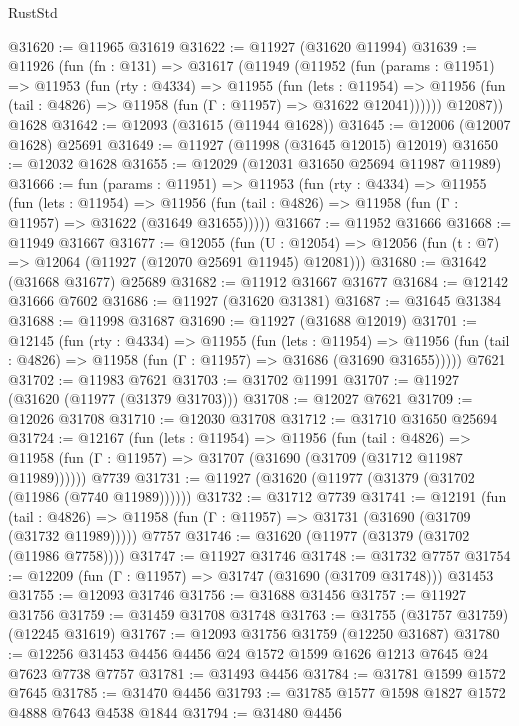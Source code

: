 \begin{lexlean}{RustStd}
\begin{coremodule}
@31620 := @11965 @31619
@31622 := @11927 (@31620 @11994)
@31639 := @11926
    (fun (fn : @131) =>
    @31617
      (@11949
        (@11952
          (fun (params : @11951) =>
          @11953
            (fun (rty : @4334) =>
            @11955
              (fun (lets : @11954) =>
              @11956 (fun (tail : @4826) => @11958 (fun (Γ : @11957) => @31622 @12041))))))
        @12087))
    @1628
@31642 := @12093 (@31615 (@11944 @1628))
@31645 := @12006 (@12007 @1628) @25691
@31649 := @11927 (@11998 (@31645 @12015) @12019)
@31650 := @12032 @1628
@31655 := @12029 (@12031 @31650 @25694 @11987 @11989)
@31666 := fun (params : @11951) =>
  @11953
    (fun (rty : @4334) =>
    @11955
      (fun (lets : @11954) =>
      @11956 (fun (tail : @4826) => @11958 (fun (Γ : @11957) => @31622 (@31649 @31655)))))
@31667 := @11952 @31666
@31668 := @11949 @31667
@31677 := @12055
    (fun (U : @12054) => @12056 (fun (t : @7) => @12064 (@11927 (@12070 @25691 @11945) @12081)))
@31680 := @31642 (@31668 @31677) @25689
@31682 := @11912 @31667 @31677
@31684 := @12142 @31666 @7602
@31686 := @11927 (@31620 @31381)
@31687 := @31645 @31384
@31688 := @11998 @31687
@31690 := @11927 (@31688 @12019)
@31701 := @12145
    (fun (rty : @4334) =>
    @11955
      (fun (lets : @11954) =>
      @11956 (fun (tail : @4826) => @11958 (fun (Γ : @11957) => @31686 (@31690 @31655)))))
    @7621
@31702 := @11983 @7621
@31703 := @31702 @11991
@31707 := @11927 (@31620 (@11977 (@31379 @31703)))
@31708 := @12027 @7621
@31709 := @12026 @31708
@31710 := @12030 @31708
@31712 := @31710 @31650 @25694
@31724 := @12167
    (fun (lets : @11954) =>
    @11956
      (fun (tail : @4826) =>
      @11958 (fun (Γ : @11957) => @31707 (@31690 (@31709 (@31712 @11987 @11989))))))
    @7739
@31731 := @11927 (@31620 (@11977 (@31379 (@31702 (@11986 (@7740 @11989))))))
@31732 := @31712 @7739
@31741 := @12191
    (fun (tail : @4826) => @11958 (fun (Γ : @11957) => @31731 (@31690 (@31709 (@31732 @11989)))))
    @7757
@31746 := @31620 (@11977 (@31379 (@31702 (@11986 @7758))))
@31747 := @11927 @31746
@31748 := @31732 @7757
@31754 := @12209 (fun (Γ : @11957) => @31747 (@31690 (@31709 @31748))) @31453
@31755 := @12093 @31746
@31756 := @31688 @31456
@31757 := @11927 @31756
@31759 := @31459 @31708 @31748
@31763 := @31755 (@31757 @31759) (@12245 @31619)
@31767 := @12093 @31756 @31759 (@12250 @31687)
@31780 := @12256 @31453 @4456 @4456 @24 @1572 @1599 @1626 @1213 @7645 @24 @7623 @7738 @7757
@31781 := @31493 @4456
@31784 := @31781 @1599 @1572 @7645
@31785 := @31470 @4456
@31793 := @31785 @1577 @1598 @1827 @1572 @4888 @7643 @4538 @1844
@31794 := @31480 @4456

\end{coremodule}
\end{lexlean}
